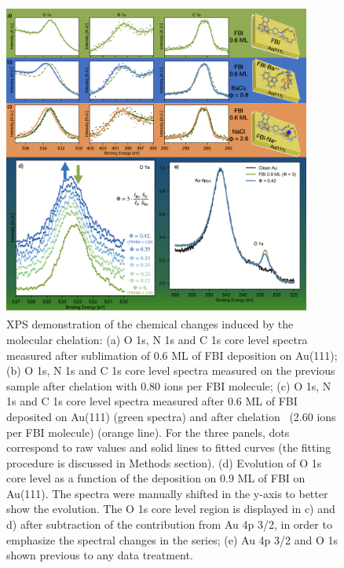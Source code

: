 \documentclass[aps,prl,reprint,longbibliography,superscriptaddress, english]{revtex4-1}
\begin{document}
\begin{figure}[ht!]
	\includegraphics[width=0.9\textwidth]{figures/Figure_2.png}
	\caption{\label{XPS_FBI_Au} 
    XPS demonstration of the chemical changes induced by the molecular chelation: (a) O 1s, N 1s and C 1s core level spectra measured after sublimation of 0.6 ML of FBI deposition on Au(111); (b) O 1s, N 1s and C 1s core level spectra measured on the previous sample after chelation with 0.80 \Bapp ions per FBI molecule; (c) O 1s, N 1s and C 1s core level spectra measured after 0.6 ML of FBI deposited on Au(111) (green spectra) and after chelation \Nap\ (2.60 \Nap ions per FBI molecule) (orange line). For the three panels, dots correspond to raw values and solid lines to fitted curves (the fitting procedure is discussed in Methods section). (d) Evolution of O 1s core level as a function of the \Bapp deposition on 0.9 ML of FBI on Au(111). The spectra were manually shifted in the y-axis to better show the evolution. The O 1s core level region is displayed in c) and d) after subtraction of the contribution from Au 4p 3/2, in order to emphasize the spectral changes in the series; (e)  Au 4p 3/2 and O 1s shown previous to any data treatment.}
\end{figure}  
\end{document}
